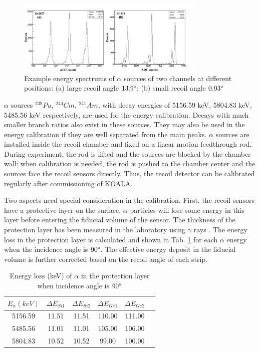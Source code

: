 \documentclass[number,5p]{elsarticle}
\begin{document}
\begin{figure}[htbp]
\centering
\includegraphics[width=0.8\textwidth]{./alpha_response.png}
\caption{Example energy spectrums of \(\alpha\) sources of two channels at different positions: (a) large recoil angle $13.9\degree$; (b) small recoil angle $0.93\degree$}
\label{fig:alpha_spectrum}
\end{figure}

\(\alpha\) sources \(^{239}Pu\), \(^{244}Cm\), \(^{241}Am\), with decay energies of 5156.59 keV, 5804.83 keV, 5485.56 keV \cite{nuclear_data} respectively, are used for the energy calibration.
Decays with much smaller branch ratios also exist in these sources. They may also be used in the energy calibration if they are well separated from the main peaks.
$\alpha$ sources are installed inside the recoil chamber and fixed on a linear motion feedthrough rod.
During experiment, the rod is lifted and the sources are blocked by the chamber wall;
when calibration is needed, the rod is pushed to the chamber center and the sources face the recoil sensors directly.
Thus, the recoil detector can be calibrated regularly after commissioning of KOALA.

Two aspects need special consideration in the calibration.
First, the recoil sensors have a protective layer on the surface. 
\(\alpha\) particles will lose some energy in this layer before entering the
fiducial volume of the sensor.
The thickness of the protection layer has been measured in the laboratory using \(\gamma\) rays \cite{recoil_article}.
The energy loss in the protection layer is calculated and shown in Tab. \ref{tab:dead_layer} for each $\alpha$ energy when the incidence angle is $90\degree$.
The effective energy deposit in the fiducial volume is further corrected based
on the recoil angle of each strip.

\begin{table}[htbp]
\label{tab:dead_layer}
\caption{Energy loss (keV) of $\alpha$ in the protection layer when incidence angle is $90\degree$}
\centering
\begin{tabular}{cccccc}
\hline
\(E_{\alpha} (keV)\) & \(\Delta E_{Si1}\) & \(\Delta E_{Si2}\) & \(\Delta E_{Ge1}\) & \(\Delta E_{Ge2}\) \\
\hline
5156.59 & 11.51 & 11.51 & 110.00 & 111.00 \\
5485.56 & 11.01 & 11.01 & 105.00 & 106.00 \\
5804.83 & 10.52 & 10.52 & 99.00  & 100.00 \\
\hline
\end{tabular}
\end{table}
\end{document}

